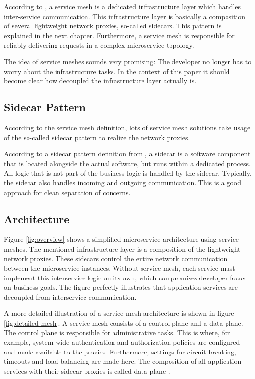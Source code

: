 According to \cite{sm1}, a service mesh is a dedicated infrastructure layer which handles inter-service communication. This infrastructure layer is basically a composition of several lightweight network proxies, so-called sidecars. This pattern is explained in the next chapter.  Furthermore, a service mesh is responsible for reliably delivering requests in a complex microservice topology.

The idea of service meshes sounds very promising: The developer no longer has to worry about the infrastructure tasks. In the context of this paper it should become clear how decoupled the infrastructure layer actually is.

\subsection{Sidecar Pattern}

According to the service mesh definition, lots of service mesh solutions take usage of the so-called sidecar pattern to realize the network proxies.

According to a sidecar pattern definition from \cite{sm3}, a sidecar is a software component that is located alongside the actual software, but runs within a dedicated process. All logic that is not part of the business logic is handled by the sidecar. Typically, the sidecar also handles incoming and outgoing communication. This is a good approach for clean separation of concerns.

\subsection{Architecture}
\label{chap:mesh-architecture}

Figure \ref{fig:overview} shows a simplified microservice architecture using service meshes. The mentioned infrastructure layer is a composition of the lightweight network proxies. These sidecars control the entire network communication between the microservice instances. Without service mesh, each service must implement this interservice logic on its own, which compromises developer focus on business goals. The figure perfectly illustrates that application services are decoupled from interservice communication.

A more detailed illustration of a service mesh architecture is shown in figure \ref{fig:detailed mesh}. A service mesh consists of a control plane and a data plane.
The control plane is responsible for administrative tasks. This is where, for example, system-wide authentication and authorization policies are configured and made available to the proxies. Furthermore, settings for circuit breaking, timeouts and load balancing are made here. The composition of all application services with their sidecar proxies is called data plane \cite{sm4}.


